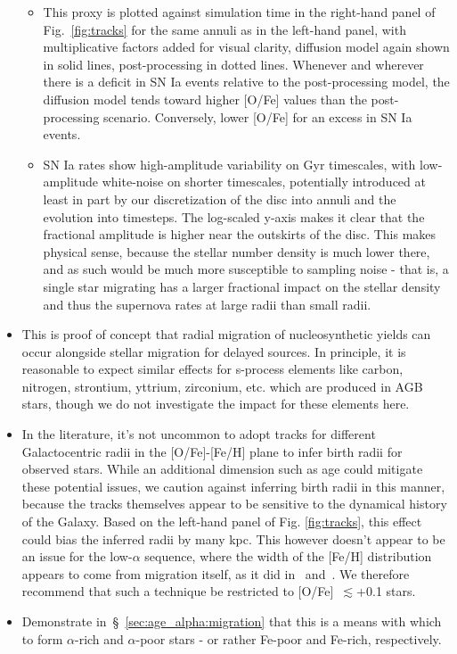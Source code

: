 \documentclass[fleqn, usenatbib]{mnras}
\begin{document}
\begin{itemize}
\begin{itemize}
		\item This proxy is plotted against simulation time in the right-hand 
		panel of Fig.~\ref{fig:tracks} for the same annuli as in the left-hand 
		panel, with multiplicative factors added for visual clarity, diffusion 
		model again shown in solid lines, post-processing in dotted lines. 
		Whenever and wherever there is a deficit in SN Ia events relative to 
		the post-processing model, the diffusion model tends toward higher 
		[O/Fe] values than the post-processing scenario. Conversely, lower 
		[O/Fe] for an excess in SN Ia events. 

		\item SN Ia rates show high-amplitude variability on Gyr timescales, 
		with low-amplitude white-noise on shorter timescales, potentially 
		introduced at least in part by our discretization of the disc into 
		annuli and the evolution into timesteps. The log-scaled y-axis makes 
		it clear that the fractional amplitude is higher near the outskirts 
		of the disc. This makes physical sense, because the stellar number 
		density is much lower there, and as such would be much more 
		susceptible to sampling noise - that is, a single star migrating 
		has a larger fractional impact on the stellar density and thus the 
		supernova rates at large radii than small radii. 
	\end{itemize} 

	\item This is proof of concept that radial migration of nucleosynthetic 
	yields can occur alongside stellar migration for delayed sources. In 
	principle, it is reasonable to expect similar effects for s-process 
	elements like carbon, nitrogen, strontium, yttrium, zirconium, etc. which 
	are produced in AGB stars, though we do not investigate the impact for 
	these elements here. 

	\item In the literature, it's not uncommon to adopt tracks for different 
	Galactocentric radii in the [O/Fe]-[Fe/H] plane to infer birth radii for 
	observed stars. While an additional dimension such as age could mitigate 
	these potential issues, we caution against inferring birth radii in this 
	manner, because the tracks themselves appear to be sensitive to the 
	dynamical history of the Galaxy. Based on the left-hand panel of Fig. 
	\ref{fig:tracks}, this effect could bias the inferred radii by many kpc. 
	This however doesn't appear to be an issue for the low-$\alpha$ sequence, 
	where the width of the [Fe/H] distribution appears to come from migration 
	itself, as it did in~\citet{Schoenrich2009} and~\citet{Nidever2014}. 
	We therefore recommend that such a technique be restricted to 
	[O/Fe]~$\lesssim$+0.1 stars. 

	\item Demonstrate in~\S~\ref{sec:age_alpha:migration} that this is a means 
	with which to form $\alpha$-rich and $\alpha$-poor stars - or rather 
	Fe-poor and Fe-rich, respectively. 
\end{itemize} 
\end{document}
